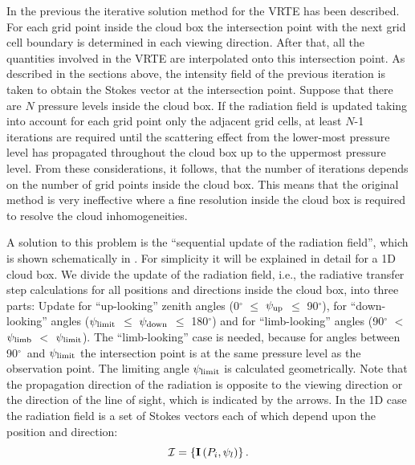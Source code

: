 In the previous  the iterative solution method
for the VRTE  
has been described. For each grid point inside the cloud box the
intersection point with the next grid cell boundary is determined in
each viewing direction.  After that, all the quantities involved in the
VRTE are interpolated onto this intersection point. As described in
the sections above, the intensity field of the previous iteration is
taken to obtain the Stokes vector at the intersection point.  Suppose
that there are $N$ pressure levels inside the cloud box.  If the
radiation field is updated taking into account for each grid point
only the adjacent grid cells, at least $N$-1 iterations are required
until the scattering effect from the lower-most pressure level has
propagated throughout the cloud box up to the uppermost pressure level.
From these considerations, it follows, that the number of iterations
depends on the number of grid points inside the cloud box.  This means
that the original method is very ineffective where a fine resolution
inside the cloud box is required to resolve the cloud inhomogeneities.

A solution to this problem is the ``sequential update of the radiation
field'', which is shown schematically in .
For simplicity it will be explained in detail for a 1D cloud box. We
divide the update of the radiation field, i.e., the radiative transfer
step calculations for all positions and directions inside the
cloud box, into three parts: Update for ``up-looking'' zenith angles
(0$^\circ$ $\le$ $\psi_\mathrm{up}$ $\le$ 90$^\circ$), for ``down-looking''
angles ($\psi_\mathrm{limit}$ $\le$ $\psi_\mathrm{down}$ $\le$ 180$^\circ$) and
for ``limb-looking'' angles (90$^\circ$ $<$ $\psi_\mathrm{limb}$ $<$
$\psi_\mathrm{limit}$). The ``limb-looking'' case is needed, because for
angles between 90$^\circ$\ and $\psi_\mathrm{limit}$ the intersection point
is at the same pressure level as the observation point. The limiting
angle $\psi_\mathrm{limit}$ is calculated geometrically.  Note that the
propagation direction of the radiation is opposite to the viewing
direction or the direction of the line of sight, which is indicated by the arrows.  In the
1D case the radiation field is a set of Stokes vectors each of which
depend upon the position and direction:
\begin{equation}
  {\mathcal I} = \left\{{\bf I} \left( P_i,\psi_l \right) \right\}. 
\end{equation}

